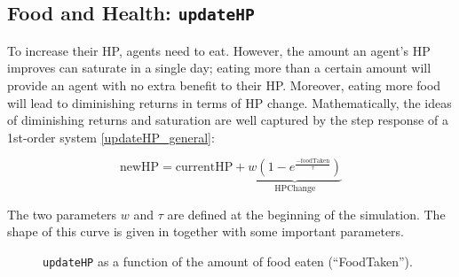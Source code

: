 \subsection{Food and Health: \texorpdfstring{\lstinline$updateHP$}{updateHP}}\label{updateHP}
To increase their HP, agents need to eat. However, the amount an agent's HP improves can saturate in a single day; eating more than a certain amount will provide an agent with no extra benefit to their HP. Moreover, eating more food will lead to diminishing returns in terms of HP change. Mathematically, the ideas of diminishing returns and saturation are well captured by the step response of a 1st-order system \eqref{updateHP_general}:

\begin{equation}\label{updateHP_general}
   \text{newHP}= \text{currentHP} +\underbrace{w(1-e^{\frac{-\text{foodTaken}}{\tau}})}_{\text{HPChange}}
\end{equation}

The two parameters $w$ and $\tau$ are defined at the beginning of the simulation. The shape of this curve is given in  together with some important parameters.

\begin{figure}[htb]%
    \centering
    \qquad
    \caption{\texttt{updateHP} as a function of the amount of food eaten (``FoodTaken'').}%
    \label{fig:updateHP}%
\end{figure}

